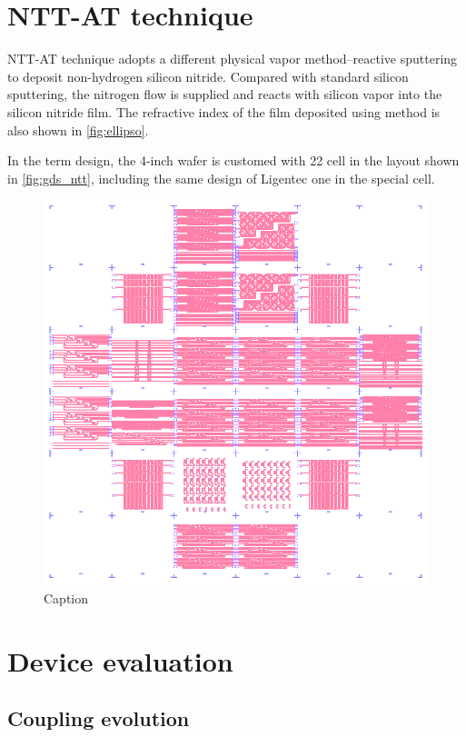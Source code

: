 \section{NTT-AT technique}


NTT-AT technique adopts a different physical vapor method--reactive sputtering to deposit non-hydrogen silicon nitride. Compared with standard silicon sputtering, the nitrogen flow is supplied and reacts with silicon vapor into the silicon nitride film. The refractive index of the film deposited using method is also shown in \autoref{fig:ellipso}.

In the term design, the 4-inch wafer is customed with 22 cell in the layout shown in \autoref{fig:gds_ntt}, including the same design of Ligentec one in the special cell.

\begin{figure}
	\centering
	\includegraphics[width=\textwidth]{imgs/png/ntt_gds.png}
	\caption{Caption}
	\label{fig:gds_ntt}
\end{figure}


\section{Device evaluation}

\subsection{Coupling evolution}

